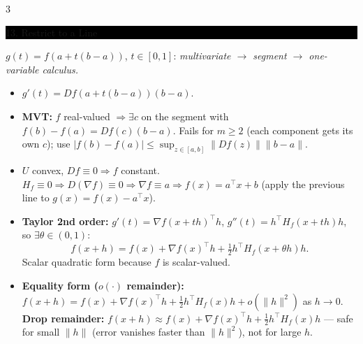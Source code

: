 \documentclass[8pt,letterpaper]{article}
\makeatletter
\newcommand{\sect}[1]{%
  \vspace{2.2pt}%
  \noindent\colorbox{black}{\parbox{\dimexpr\linewidth-2\fboxsep}{%
    \color{white}\bfseries\scshape\fontsize{6.4}{7.4}\selectfont
    \hyphenpenalty=10000\exhyphenpenalty=10000\raggedright #1}}%
  \vspace{1.4pt}\par\nopagebreak\@afterheading}
\newenvironment{tl}
  {\begin{itemize}[leftmargin=6pt,itemsep=0.3pt,topsep=1pt,parsep=0pt,
                   partopsep=0pt,label=\textcolor{gray}{\tiny$\bullet$}]}
  {\end{itemize}}
\newcommand{\Dd}{D}
\newcommand{\tp}{^{\!\top}}
\newcommand{\nm}[1]{\lVert #1\rVert}
\makeatother
\begin{document}
\begin{multicols}{3}
\sect{13. Restrict to a Line}
$g(t)=f(a+t(b-a))$, $t\in[0,1]$: \emph{multivariate $\to$ segment $\to$ one-variable calculus.}
\begin{tl}
\item $g'(t)=\Dd f(a+t(b-a))(b-a)$.
\item \textbf{MVT:} $f$ real-valued $\Rightarrow\exists c$ on the segment with $f(b)-f(a)=\Dd f(c)(b-a)$. \colorbox{black!12}{Fails for $m\ge2$} (each component gets its own $c$); use $|f(b)-f(a)|\le\sup_{z\in[a,b]}\nm{\Dd f(z)}\nm{b-a}$.
\item $U$ convex, $\Dd f\equiv0\Rightarrow f$ constant. $H_f\equiv0\Rightarrow\Dd(\nabla f)\equiv0\Rightarrow\nabla f\equiv a\Rightarrow f(x)=a\tp x+b$ (apply the previous line to $g(x)=f(x)-a\tp x$).
\item \textbf{Taylor 2nd order:} $g'(t)=\nabla f(x+th)\tp h$, $g''(t)=h\tp H_f(x+th)h$, so $\exists\theta\in(0,1)$:
\[ f(x+h)=f(x)+\nabla f(x)\tp h+\tfrac12 h\tp H_f(x+\theta h)h. \]
Scalar quadratic form because $f$ is scalar-valued.
\item \textbf{Equality form ($o(\cdot)$ remainder):} $f(x+h)=f(x)+\nabla f(x)\tp h+\tfrac12h\tp H_f(x)h+o(\nm h^2)$ as $h\to0$. \textbf{Drop remainder:} $f(x+h)\approx f(x)+\nabla f(x)\tp h+\tfrac12h\tp H_f(x)h$ --- safe for small $\nm h$ (error vanishes faster than $\nm h^2$), not for large $h$.
\end{tl}


\end{multicols}
\end{document}
